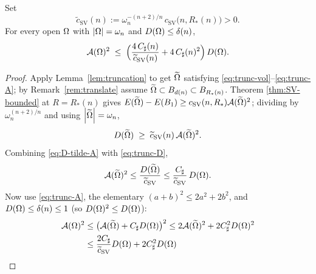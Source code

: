 \begin{lemma}\label{lem:near}
Set
\begin{equation}\label{eq:csv-tilde}
   \widetilde c_{\mathrm{SV}}(n)
   :=\omega_n^{-(n+2)/n}\,c_{\mathrm{SV}}\bigl(n,R_*(n)\bigr)>0 .
\end{equation}
For every open $\Omega$ with $\left|\Omega\right|=\omega_n$ and
$D(\Omega)\le\delta(n)$,
\begin{equation}\label{eq:near-Fr}
   \mathcal A(\Omega)^2\;\le\;
   \Bigl(\frac{4\,C_\sharp(n)}{\widetilde c_{\mathrm{SV}}(n)}
        +4\,C_\sharp(n)^2\Bigr)\,D(\Omega).
\end{equation}
\end{lemma}

\begin{proof}
Apply Lemma~\ref{lem:truncation} to get $\widetilde{\Omega}$ satisfying
\eqref{eq:trunc-vol}--\eqref{eq:trunc-A}; by Remark~\ref{rem:translate}
assume $\widetilde{\Omega}\subset B_{d(n)}\subset B_{R_*(n)}$. Theorem
\ref{thm:SV-bounded} at $R=R_*(n)$ gives
$E(\widetilde{\Omega})-E(B_1)\ge c_{\mathrm{SV}}(n,R_*)\mathcal A(\widetilde{\Omega})^2$; dividing by
$\omega_n^{(n+2)/n}$ and using $\left|\widetilde{\Omega}\right|=\omega_n$,
\begin{equation}\label{eq:D-tilde-A}
   D(\widetilde{\Omega})\;\ge\;\widetilde c_{\mathrm{SV}}(n)\,\mathcal A(\widetilde{\Omega})^2 .
\end{equation}
Combining \eqref{eq:D-tilde-A} with \eqref{eq:trunc-D},
\[
   \mathcal A(\widetilde{\Omega})^2\le\frac{D(\widetilde{\Omega})}{\widetilde c_{\mathrm{SV}}}
   \le\frac{C_\sharp}{\widetilde c_{\mathrm{SV}}}\,D(\Omega).
\]
Now use \eqref{eq:trunc-A}, the elementary
$(a+b)^2\le2a^2+2b^2$, and $D(\Omega)\le\delta(n)\le1$ (so
$D(\Omega)^2\le D(\Omega)$):
\begin{align*}
   \Fr(\Om)^2
   &\le\bigl(\Fr(\Otilde)+C_\sharp D(\Om)\bigr)^2
    \le2\Fr(\Otilde)^2+2C_\sharp^2D(\Om)^2\\
   &\le\frac{2C_\sharp}{\widetilde c_{\mathrm{SV}}}D(\Om)+2C_\sharp^2D(\Om)

\end{align*}
\end{proof}
